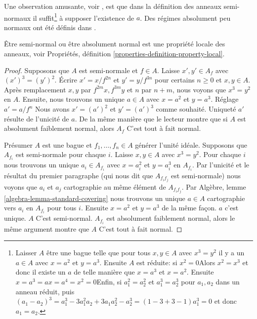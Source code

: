 \noindent

Une observation amusante, voir \cite{Costa}, est que dans la définition des anneaux semi-normaux il suffit\footnote{Laisser
$A$ être une bague telle que pour tous $x, y \in A$ avec $x^3 = y^2$ il y a un $a \in A$ avec $x = a^2$ et $y = a^3$. Ensuite $A$ est réduite: si
$x^2 = 0$Alors $x^2 = x^3$ et donc il existe un $a$ de telle manière que
$x = a^3$ et $x = a^2$. Ensuite $x = a^3 = ax = a^4 = x^2 = 0$Enfin, si $a_1^2 = a_2^2$ et $a_1^3 = a_2^3$ pour $a_1, a_2$ dans un anneau réduit, puis $(a_1 - a_2)^3 = a_1^3 - 3a_1^2a_2 +3a_1a_2^2 - a_2^3 =
(1 - 3 + 3 - 1)a_1^3 = 0$ et donc $a_1 = a_2$.} à supposer l'existence de $a$. Des régimes absolument peu normaux ont été définis dans
\cite[Annexe B]{rydh_descent}.

\begin{lemma}

\label{lemma-seminormal-local-property}
Être semi-normal ou être absolument normal est une propriété locale des anneaux, voir Propriétés, définition \ref{properties-definition-property-local}.
\end{lemma}

\begin{proof}

Supposons que $A$ est semi-normale et $f \in A$. Laisse $x', y' \in A_f$
avec $(x')^3 = (y')^2$. Écrire $x' = x/f^{2n}$ et $y' = y/f^{3n}$
pour certains $n \geq 0$ et $x, y \in A$. Après remplacement $x, y$
par $f^{2m}x, f^{3m}y$ et $n$ par $n + m$, nous voyons que
$x^3 = y^2$ en $A$. Ensuite, nous trouvons un unique $a \in A$ avec
$x = a^2$ et $y = a^3$. Réglage $a' = a/f^n$ Nous avons
$x' = (a')^2$ et $y' = (a')^3$ comme souhaité. Uniqueté $a'$ résulte de l'unicité de $a$. De la même manière que le lecteur montre que si $A$ est absolument faiblement normal, alors $A_f$ C'est tout à fait normal.

\medskip\noindent

Présumer $A$ est une bague et $f_1, \ldots, f_n \in A$ générer l'unité idéale. Supposons que $A_{f_i}$ est semi-normale pour chaque $i$. Laisse $x, y \in A$ avec $x^3 = y^2$. Pour chaque $i$ nous trouvons un unique
$a_i \in A_{f_i}$ avec $x = a_i^2$ et $y = a_i^3$ en $A_{f_i}$. Par l'unicité et le résultat du premier paragraphe (qui nous dit que $A_{f_if_j}$ est semi-normale) nous voyons que
$a_i$ et $a_j$ cartographie au même élément de $A_{f_if_j}$. Par Algèbre, lemme \ref{algebra-lemma-standard-covering}
nous trouvons un unique $a \in A$
cartographie vers $a_i$ en $A_{f_i}$ pour tous $i$. Ensuite $x = a^2$ et $y = a^3$ de la même façon. $a$ c'est unique. $A$ C'est semi-normal. $A_{f_i}$ est absolument faiblement normal, alors le même argument montre que $A$ C'est tout à fait normal.

\end{proof}

